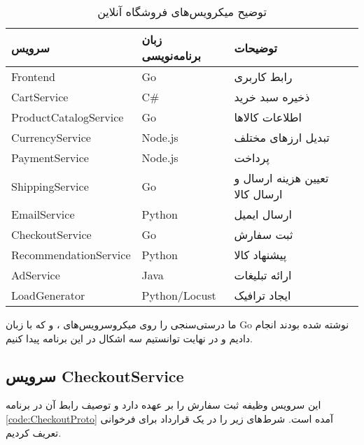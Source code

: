 \begin{table}
    \caption{توضیح میکرویس‌های فروشگاه آنلاین}
    \label{tab:microservices}
    \centering
    \begin{tabular}{|l|l|l|}
    \hline
        سرویس & زبان برنامه‌نویسی & توضیحات \\ \hline
        Frontend & Go & رابط کاربری \\ \hline
        CartService & C\# & ذخیره سبد خرید \\ \hline
        ProductCatalogService	 & Go & اطلاعات کالاها \\ \hline
        CurrencyService & Node.js & تبدیل ارز‌های مختلف \\ \hline
        PaymentService & Node.js & پرداخت \\ \hline
        ShippingService & Go & تعیین هزینه ارسال و ارسال کالا \\ \hline
        EmailService & Python & ارسال ایمیل \\ \hline
        CheckoutService & Go & ثبت سفارش \\ \hline
        RecommendationService & Python & پیشنهاد کالا \\ \hline
        AdService & Java & ارائه تبلیغات \\ \hline
        LoadGenerator & Python/Locust & ایجاد ترافیک \\ \hline
    \end{tabular}
\end{table}
ما درستی‌سنجی را روی میکروسرویس‌های 
،
و
که با زبان
Go
نوشته شده بودند انجام دادیم
\cite{forkedMicroservicesDemo}
و در نهایت توانستیم سه اشکال در این برنامه پیدا کنیم.

\subsection{
سرویس CheckoutService
}

\singlespacing
\begin{figure}
	\begin{LTR}
		
	\end{LTR}
\end{figure}
\doublespacing

این سرویس وظیفه ثبت سفارش را بر عهده دارد و توصیف رابط آن در برنامه
\ref{code:CheckoutProto}
آمده است. شرط‌های زیر را در یک قرارداد برای فرخوانی
تعریف کردیم.

